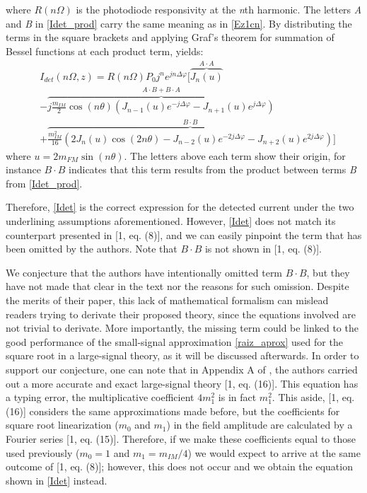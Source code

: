 \documentclass[journal]{IEEEtran}
\begin{document}
where $R(n\Omega)$ is the photodiode responsivity at the \emph{n}th harmonic. The letters \emph{A} and \emph{B} in \eqref{Idet_prod} carry the same meaning as in \eqref{Ez1cn}. By distributing the terms in the square brackets and applying Graf's theorem for summation of Bessel functions \cite{bessel} at each product term, yields:
\begin{align} \label{Idet} \nonumber
&I_{det}(n\Omega, z) = R(n\Omega)P_0j^ne^{jn\Delta\varphi}[\overbrace{J_n(u)}^{A\cdot A}\\ \nonumber
& - \overbrace{j\textstyle\frac{m_{IM}}{2} \cos{(n\theta)}(J_{n-1}(u)e^{-j\Delta\varphi} - J_{n+1}(u)e^{j\Delta\varphi})}^{A\cdot B + B\cdot A} \\
& + \overbrace{\textstyle\frac{m_{IM}^2}{16}(2J_n(u)\cos{(2n\theta)} - J_{n-2}(u)e^{-2j\Delta\varphi} - J_{n+2}(u)e^{2j\Delta\varphi})}^{B\cdot B}]
\end{align}
where $u = 2m_{FM}\sin(n\theta)$. The letters above each term show their origin, for instance $B\cdot B$ indicates that this term results from the product between terms \emph{B} from \eqref{Idet_prod}.

Therefore, \eqref{Idet} is the correct expression for the detected current under the two underlining assumptions aforementioned. However, \eqref{Idet} does not match its counterpart presented in [1, eq. (8)], and we can easily pinpoint the term that has been omitted by the authors.  Note that $B\cdot B$ is not shown in [1, eq. (8)]. 

We conjecture that the authors have intentionally omitted term $B\cdot B$, but they have not made that clear in the text nor the reasons for such omission. Despite the merits of their paper, this lack of mathematical formalism can mislead readers trying to derivate their proposed theory, since the equations involved are not trivial to derivate. More importantly, the missing term could be linked to the good performance of the small-signal approximation \eqref{raiz_aprox} used for the square root in a large-signal theory, as it will be discussed afterwards. In order to support our conjecture, one can note that in Appendix A of \cite{eva}, the authors carried out a more accurate and exact large-signal theory [1, eq. (16)]. This equation has a typing error, the multiplicative coefficient $4m_1^2$ is in fact $m_1^2$. This aside, [1, eq. (16)] considers the same approximations made before, but the coefficients for square root linearization ($m_0$ and $m_1$) in the field amplitude are calculated by a Fourier series [1, eq. (15)]. Therefore, if we make these coefficients equal to those used previously ($m_0 = 1$ and $m_1 = m_{IM}/4$) we would expect to arrive at the same outcome of [1, eq. (8)]; however, this does not occur and we obtain the equation shown in \eqref{Idet} instead. 
\end{document}
